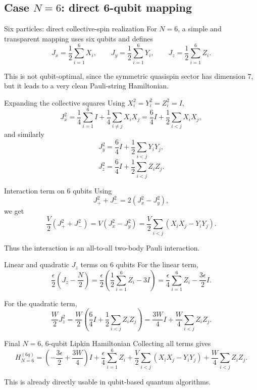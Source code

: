 \documentclass[aspectratio=169]{beamer}
\begin{document}
\subsection{Case \(N=6\): direct 6-qubit mapping}

\begin{frame}{Six particles: direct collective-spin realization}
For \(N=6\), a simple and transparent mapping uses six qubits and defines
\[
J_x = \frac{1}{2}\sum_{i=1}^{6} X_i,
\qquad
J_y = \frac{1}{2}\sum_{i=1}^{6} Y_i,
\qquad
J_z = \frac{1}{2}\sum_{i=1}^{6} Z_i.
\]

This is not qubit-optimal, since the symmetric quasispin sector has dimension \(7\), but it leads to a very clean Pauli-string Hamiltonian.
\end{frame}

\begin{frame}{Expanding the collective squares}
Using \(X_i^2=Y_i^2=Z_i^2=I\),
\[
J_x^2
=
\frac{1}{4}\sum_{i=1}^{6} I
+
\frac{1}{4}\sum_{i\neq j} X_iX_j
=
\frac{6}{4}I + \frac{1}{2}\sum_{i<j} X_iX_j,
\]
and similarly
\[
J_y^2
=
\frac{6}{4}I + \frac{1}{2}\sum_{i<j} Y_iY_j,
\]
\[
J_z^2
=
\frac{6}{4}I + \frac{1}{2}\sum_{i<j} Z_iZ_j.
\]
\end{frame}

\begin{frame}{Interaction term on 6 qubits}
Using
\[
J_+^2+J_-^2=2(J_x^2-J_y^2),
\]
we get
\[
\frac{V}{2}(J_+^2+J_-^2)
=
V(J_x^2-J_y^2)
=
\frac{V}{2}\sum_{i<j}(X_iX_j-Y_iY_j).
\]

Thus the interaction is an all-to-all two-body Pauli interaction.
\end{frame}

\begin{frame}{Linear and quadratic \(J_z\) terms on 6 qubits}
For the linear term,
\[
\frac{\epsilon}{2}\left(J_z-\frac{N}{2}\right)
=
\frac{\epsilon}{2}\left(\frac12\sum_{i=1}^{6}Z_i - 3I\right)
=
\frac{\epsilon}{4}\sum_{i=1}^{6} Z_i - \frac{3\epsilon}{2}I.
\]

For the quadratic term,
\[
\frac{W}{2}J_z^2
=
\frac{W}{2}\left(\frac{6}{4}I+\frac12\sum_{i<j}Z_iZ_j\right)
=
\frac{3W}{4}I+\frac{W}{4}\sum_{i<j}Z_iZ_j.
\]
\end{frame}

\begin{frame}{Final \(N=6\), 6-qubit Lipkin Hamiltonian}
Collecting all terms gives
\[
H_{N=6}^{(6q)}
=
\left(-\frac{3\epsilon}{2}+\frac{3W}{4}\right)I
+
\frac{\epsilon}{4}\sum_{i=1}^{6} Z_i
+
\frac{V}{2}\sum_{i<j}(X_iX_j-Y_iY_j)
+
\frac{W}{4}\sum_{i<j} Z_iZ_j.
\]

This is already directly usable in qubit-based quantum algorithms.
\end{frame}
\end{document}
